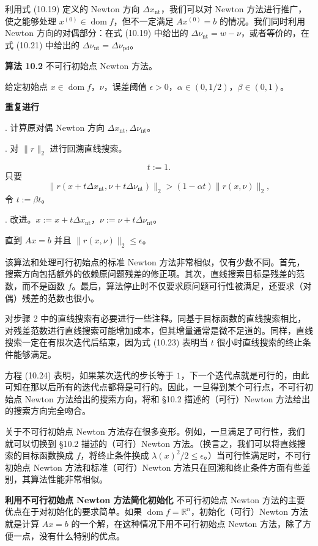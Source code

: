 \documentclass[UTF8,12pt,a4paper,fontset=fandol]{ctexart}
\begin{document}
利用式 (10.19) 定义的 Newton 方向 $\Delta x_{\mathrm{nt}}$，我们可以对 Newton 方法进行推广，使之能够处理 $x^{(0)}\in\operatorname{dom} f$，但不一定满足 $Ax^{(0)}=b$ 的情况。我们同时利用 Newton 方向的对偶部分：在式 (10.19) 中给出的 $\Delta\nu_{\mathrm{nt}}=w-\nu$，或者等价的，在式 (10.21) 中给出的 $\Delta\nu_{\mathrm{nt}}=\Delta\nu_{\mathrm{pd}}$。

\noindent\textbf{算法 10.2}\quad
不可行初始点 Newton 方法。

给定初始点 $x\in\operatorname{dom} f$，$\nu$，误差阈值 $\epsilon>0$，$\alpha\in(0,1/2)$，$\beta\in(0,1)$。

\noindent\textbf{重复进行}

. 计算原对偶 Newton 方向 $\Delta x_{\mathrm{nt}},\Delta\nu_{\mathrm{nt}}$。

. 对 $\|r\|_2$ 进行回溯直线搜索。

\[
t:=1.
\]
只要
\[
\|r(x+t\Delta x_{\mathrm{nt}},\nu+t\Delta\nu_{\mathrm{nt}})\|_2>(1-\alpha t)\|r(x,\nu)\|_2,
\]
令 $t:=\beta t$。

. 改进。$x:=x+t\Delta x_{\mathrm{nt}}$，$\nu:=\nu+t\Delta\nu_{\mathrm{nt}}$。

直到 $Ax=b$ 并且 $\|r(x,\nu)\|_2\leq \epsilon$。

该算法和处理可行初始点的标准 Newton 方法非常相似，仅有少数不同。首先，搜索方向包括额外的依赖原问题残差的修正项。其次，直线搜索目标是残差的范数，而不是函数 $f$。最后，算法停止时不仅要求原问题可行性被满足，还要求（对偶）残差的范数也很小。

对步骤 2 中的直线搜索有必要进行一些注释。同基于目标函数的直线搜索相比，对残差范数进行直线搜索可能增加成本，但其增量通常是微不足道的。同样，直线搜索一定在有限次迭代后结束，因为式 (10.23) 表明当 $t$ 很小时直线搜索的终止条件能够满足。

方程 (10.24) 表明，如果某次迭代的步长等于 $1$，下一个迭代点就是可行的，由此可知在那以后所有的迭代点都将是可行的。因此，一旦得到某个可行点，不可行初始点 Newton 方法给出的搜索方向，将和 \S10.2 描述的（可行）Newton 方法给出的搜索方向完全吻合。

关于不可行初始点 Newton 方法存在很多变形。例如，一旦满足了可行性，我们就可以切换到 \S10.2 描述的（可行）Newton 方法。（换言之，我们可以将直线搜索的目标函数换成 $f$，将终止条件换成 $\lambda(x)^2/2\leq \epsilon$。）当可行性满足时，不可行初始点 Newton 方法和标准（可行）Newton 方法只在回溯和终止条件方面有些差别，其算法性能非常相似。

\noindent\textbf{利用不可行初始点 Newton 方法简化初始化}\quad
不可行初始点 Newton 方法的主要优点在于对初始化的要求简单。如果 $\operatorname{dom} f=\mathbb{R}^n$，初始化（可行）Newton 方法就是计算 $Ax=b$ 的一个解，在这种情况下用不可行初始点 Newton 方法，除了方便一点，没有什么特别的优点。
\end{document}
